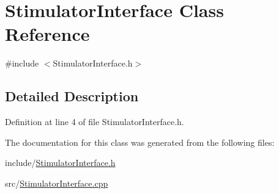\hypertarget{class_stimulator_interface}{}\section{Stimulator\+Interface Class Reference}
\label{class_stimulator_interface}


{\ttfamily \#include $<$Stimulator\+Interface.\+h$>$}



\subsection{Detailed Description}


Definition at line 4 of file Stimulator\+Interface.\+h.



The documentation for this class was generated from the following files\+:\begin{DoxyCompactItemize}
\item 
include/\hyperlink{_stimulator_interface_8h}{Stimulator\+Interface.\+h}\item 
src/\hyperlink{_stimulator_interface_8cpp}{Stimulator\+Interface.\+cpp}\end{DoxyCompactItemize}
